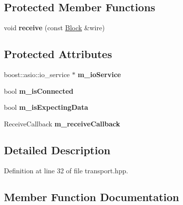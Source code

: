 \subsection*{Protected Member Functions}
\begin{DoxyCompactItemize}
\item 
void {\bfseries receive} (const \hyperlink{classndn_1_1Block}{Block} \&wire)\hypertarget{classndn_1_1Transport_a8351e7b61901941b2f4b1e9768e081c7}{}\label{classndn_1_1Transport_a8351e7b61901941b2f4b1e9768e081c7}

\end{DoxyCompactItemize}
\subsection*{Protected Attributes}
\begin{DoxyCompactItemize}
\item 
boost\+::asio\+::io\+\_\+service $\ast$ {\bfseries m\+\_\+io\+Service}\hypertarget{classndn_1_1Transport_a0c9957768b4dbc793d584e2508d2b129}{}\label{classndn_1_1Transport_a0c9957768b4dbc793d584e2508d2b129}

\item 
bool {\bfseries m\+\_\+is\+Connected}\hypertarget{classndn_1_1Transport_af8ce46528d96aacd99b432d6c2aee5af}{}\label{classndn_1_1Transport_af8ce46528d96aacd99b432d6c2aee5af}

\item 
bool {\bfseries m\+\_\+is\+Expecting\+Data}\hypertarget{classndn_1_1Transport_a9ac943937fe557b6101a01d47ac8e846}{}\label{classndn_1_1Transport_a9ac943937fe557b6101a01d47ac8e846}

\item 
Receive\+Callback {\bfseries m\+\_\+receive\+Callback}\hypertarget{classndn_1_1Transport_aa054e238dae973d3dfbc6e6d9f69a8f2}{}\label{classndn_1_1Transport_aa054e238dae973d3dfbc6e6d9f69a8f2}

\end{DoxyCompactItemize}


\subsection{Detailed Description}


Definition at line 32 of file transport.\+hpp.



\subsection{Member Function Documentation}
